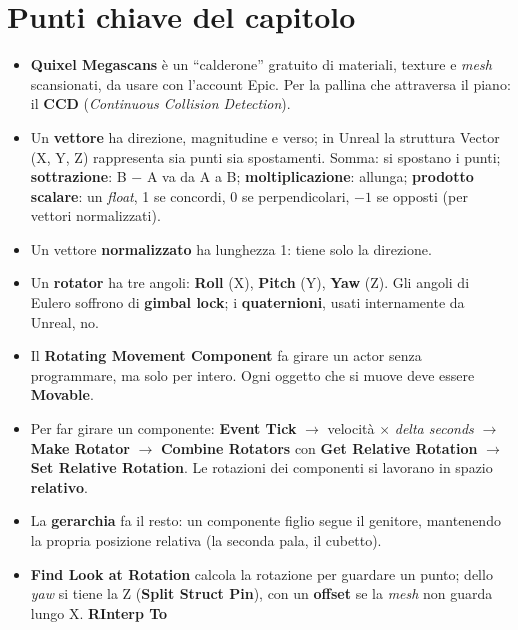 \section*{Punti chiave del capitolo}

\begin{itemize}
  \item \textbf{Quixel Megascans} è un ``calderone'' gratuito di materiali, texture e
        \emph{mesh} scansionati, da usare con l'account Epic. Per la pallina che
        attraversa il piano: il \textbf{CCD} (\emph{Continuous Collision Detection}).
  \item Un \textbf{vettore} ha direzione, magnitudine e verso; in Unreal la struttura
        Vector (X, Y, Z) rappresenta sia punti sia spostamenti. Somma: si spostano i
        punti; \textbf{sottrazione}: B $-$ A va da A a B; \textbf{moltiplicazione}:
        allunga; \textbf{prodotto scalare}: un \emph{float}, 1 se concordi, 0 se
        perpendicolari, $-1$ se opposti (per vettori normalizzati).
  \item Un vettore \textbf{normalizzato} ha lunghezza 1: tiene solo la direzione.
  \item Un \textbf{rotator} ha tre angoli: \textbf{Roll} (X), \textbf{Pitch} (Y),
        \textbf{Yaw} (Z). Gli angoli di Eulero soffrono di \textbf{gimbal lock}; i
        \textbf{quaternioni}, usati internamente da Unreal, no.
  \item Il \textbf{Rotating Movement Component} fa girare un actor senza programmare,
        ma solo per intero. Ogni oggetto che si muove deve essere \textbf{Movable}.
  \item Per far girare un componente: \textbf{Event Tick} $\rightarrow$ velocità
        $\times$ \emph{delta seconds} $\rightarrow$ \textbf{Make Rotator}
        $\rightarrow$ \textbf{Combine Rotators} con \textbf{Get Relative Rotation}
        $\rightarrow$ \textbf{Set Relative Rotation}. Le rotazioni dei componenti si
        lavorano in spazio \textbf{relativo}.
  \item La \textbf{gerarchia} fa il resto: un componente figlio segue il genitore,
        mantenendo la propria posizione relativa (la seconda pala, il cubetto).
  \item \textbf{Find Look at Rotation} calcola la rotazione per guardare un punto;
        dello \emph{yaw} si tiene la Z (\textbf{Split Struct Pin}), con un
        \textbf{offset} se la \emph{mesh} non guarda lungo X. \textbf{RInterp To}

\end{itemize}
